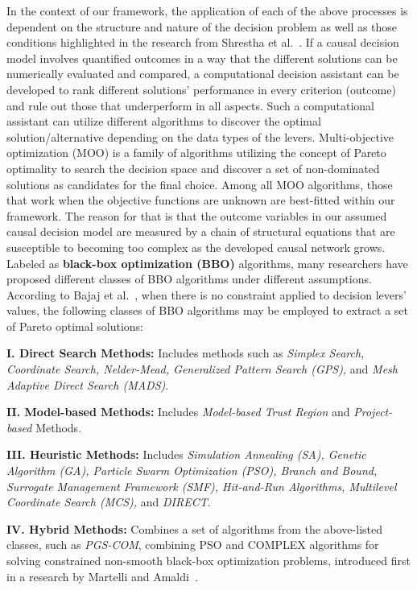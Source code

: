 \documentclass{sfuthesis}
\begin{document}
In the context of our framework, the application of each of the above processes is dependent on the structure and nature of the decision problem as well as those conditions highlighted in the research from Shrestha et al.~\cite{shrestha_organizational_2019}. If a causal decision model involves quantified outcomes in a way that the different solutions can be numerically evaluated and compared, a computational decision assistant can be developed to rank different solutions’ performance in every criterion (outcome) and rule out those that underperform in all aspects. Such a computational assistant can utilize different algorithms to discover the optimal solution/alternative depending on the data types of the levers. Multi-objective optimization (MOO) is a family of algorithms utilizing the concept of Pareto optimality to search the decision space and discover a set of non-dominated solutions as candidates for the final choice. Among all MOO algorithms, those that work when the objective functions are unknown are best-fitted within our framework. The reason for that is that the outcome variables in our assumed causal decision model are measured by a chain of structural equations that are susceptible to becoming too complex as the developed causal network grows. Labeled as \textbf{black-box optimization (BBO)} algorithms, many researchers have proposed different classes of BBO algorithms under different assumptions. According to Bajaj et al.~\cite{bajaj2021black}, when there is no constraint applied to decision levers’ values, the following classes of BBO algorithms may be employed to extract a set of Pareto optimal solutions:\par
\textbf{I. Direct Search Methods:} Includes methods such as \textit{Simplex Search, Coordinate Search, Nelder-Mead, Generalized Pattern Search (GPS),} and \textit{Mesh Adaptive Direct Search (MADS)}.\par
\textbf{II. Model-based Methods:} Includes \textit{Model-based Trust Region} and \textit{Project-based} Methods.\par
\textbf{III. Heuristic Methods:} Includes \textit{Simulation Annealing (SA), Genetic Algorithm (GA), Particle Swarm Optimization (PSO), Branch and Bound, Surrogate Management Framework (SMF), Hit-and-Run Algorithms, Multilevel Coordinate Search (MCS),} and \textit{DIRECT}.\par
\textbf{IV.	Hybrid Methods:} Combines a set of algorithms from the above-listed classes, such as \textit{PGS-COM}, combining PSO and COMPLEX algorithms for solving constrained non-smooth black-box optimization problems, introduced first in a research by Martelli and Amaldi~\cite{martelli2014pgs}.\par
\end{document}
